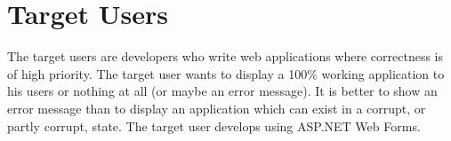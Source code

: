 \section{Target Users}
	The target users are developers who write web applications where correctness is of high priority. The target user wants to display a 100\% working application to his users or nothing at all (or maybe an error message). It is better to show an error message than to display an application which can exist in a corrupt, or partly corrupt, state. The target user develops using ASP.NET Web Forms.


